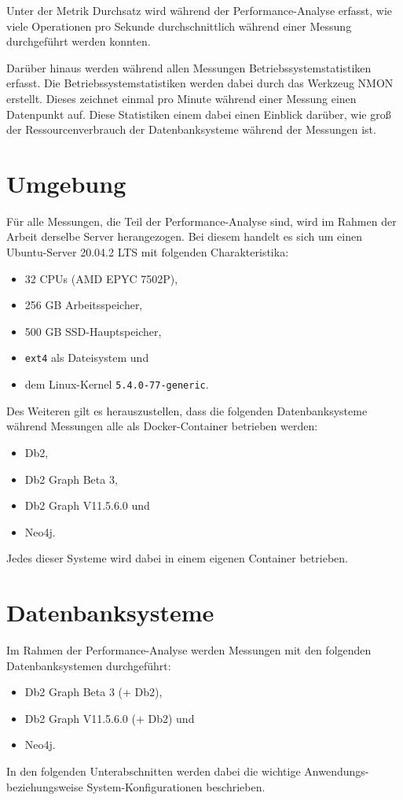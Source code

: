 Unter der Metrik Durchsatz wird während der Performance-Analyse erfasst, wie viele Operationen pro Sekunde durchschnittlich während einer Messung durchgeführt werden konnten. 

Darüber hinaus werden während allen Messungen Betriebssystemstatistiken erfasst. Die Betriebssystemstatistiken werden dabei durch das Werkzeug NMON erstellt. Dieses zeichnet einmal pro Minute während einer Messung einen Datenpunkt auf. Diese Statistiken einem dabei einen Einblick darüber, wie groß der Ressourcenverbrauch der Datenbanksysteme während der Messungen ist.

\section{Umgebung}
\label{analyse:umgebung}
Für alle Messungen, die Teil der Performance-Analyse sind, wird im Rahmen der Arbeit derselbe Server herangezogen. Bei diesem handelt es sich um einen Ubuntu-Server 20.04.2 LTS mit folgenden Charakteristika:
\begin{itemize}
    \item 32 CPUs (AMD EPYC 7502P), 
    \item 256 GB Arbeitsspeicher,
    \item 500 GB SSD-Hauptspeicher,
    \item \texttt{ext4} als Dateisystem und 
    \item dem Linux-Kernel \texttt{5.4.0-77-generic}.
\end{itemize}
Des Weiteren gilt es herauszustellen, dass die folgenden Datenbanksysteme während Messungen alle als Docker-Container betrieben werden: 
\begin{itemize}
    \item Db2,
    \item Db2 Graph Beta 3,
    \item Db2 Graph V11.5.6.0 und 
    \item Neo4j. 
\end{itemize}
Jedes dieser Systeme wird dabei in einem eigenen Container betrieben. 

\section{Datenbanksysteme}
\label{analyse:datanbanksysteme}
Im Rahmen der Performance-Analyse werden Messungen mit den folgenden Datenbanksystemen durchgeführt: 
\begin{itemize}
    \item Db2 Graph Beta 3 (+ Db2),
    \item Db2 Graph V11.5.6.0 (+ Db2) und
    \item Neo4j.
\end{itemize}
In den folgenden Unterabschnitten werden dabei die wichtige Anwendungs- beziehungsweise System-Konfigurationen beschrieben. 

